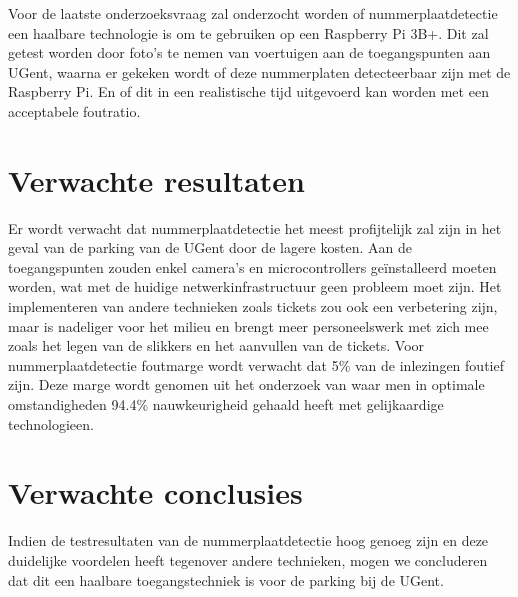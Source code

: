 Voor de laatste onderzoeksvraag zal onderzocht worden of nummerplaatdetectie een haalbare technologie is om te gebruiken op een Raspberry Pi 3B+. Dit zal getest worden door foto’s te nemen van voertuigen aan de toegangspunten aan UGent, waarna er gekeken wordt of deze nummerplaten detecteerbaar zijn met de Raspberry Pi. En of dit in een realistische tijd uitgevoerd kan worden met een acceptabele foutratio.

\section{Verwachte resultaten}
\label{sec:verwachte_resultaten}

Er wordt verwacht dat nummerplaatdetectie het meest profijtelijk zal zijn in het geval van de parking van de UGent door de lagere kosten. Aan de toegangspunten zouden enkel camera’s en microcontrollers geïnstalleerd moeten worden, wat met de huidige netwerkinfrastructuur geen probleem moet zijn. Het implementeren van andere technieken zoals tickets zou ook een verbetering zijn, maar is nadeliger voor het milieu en brengt meer personeelswerk met zich mee zoals het legen van de slikkers en het aanvullen van de tickets. Voor nummerplaatdetectie foutmarge wordt verwacht dat 5\% van de inlezingen foutief zijn. Deze marge wordt genomen uit het onderzoek van \textcite{figuerola2016automated} waar men in optimale omstandigheden 94.4\% nauwkeurigheid gehaald heeft met gelijkaardige technologieen.

\section{Verwachte conclusies}
\label{sec:verwachte_conclusies}

Indien de testresultaten van de nummerplaatdetectie hoog genoeg zijn en deze duidelijke voordelen heeft tegenover andere technieken, mogen we concluderen dat dit een haalbare toegangstechniek is voor de parking bij de UGent.

